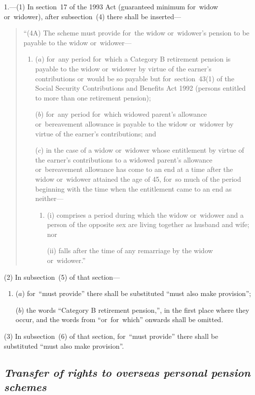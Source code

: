 \documentclass[12pt,a4paper]{article}
\begin{document}
1.---(1) In section~17 of the 1993 Act (guaranteed minimum for~widow or~widower), after subsection~(4)  there shall be inserted—
\begin{quotation}
“(4A) The scheme must provide for~the widow or~widower’s pension to be payable to the widow or~widower—
\begin{enumerate}\item[]
($a$) for~any period for~which a Category B retirement pension is payable to the widow or~widower by virtue of the earner’s contributions or~would be so payable but for~section~43(1)  of the Social Security Contributions and Benefits Act 1992 (persons entitled to more than one retirement pension);

($b$) for~any period for~which widowed parent’s allowance or~bereavement allowance is payable to the widow or~widower by virtue of the earner’s contributions; and

($c$) in the case of a widow or~widower whose entitlement by virtue of the earner’s contributions to a widowed parent’s allowance or~bereavement allowance has come to an end at a time after the widow or~widower attained the age of 45, for~so much of the period beginning with the time when the entitlement came to an end as neither—
\begin{enumerate}\item[]
(i) comprises a period during which the widow or~widower and a person of the opposite sex are living together as husband and wife; nor

(ii) falls after the time of any remarriage by the widow or~widower.”
\end{enumerate}
\end{enumerate}
\end{quotation}

(2) In subsection~(5)  of that section—
\begin{enumerate}\item[]
($a$) for~“must provide” there shall be substituted “must also make provision”;

($b$) the words “Category B retirement pension,”, in the first place where they occur, and the words from “or~for~which” onwards shall be omitted.
\end{enumerate}

(3) In subsection~(6)  of that section, for~“must provide” there shall be substituted “must also make provision”.

\subsection*{\itshape\sloppy Transfer of rights to overseas personal pension schemes}
\end{document}
